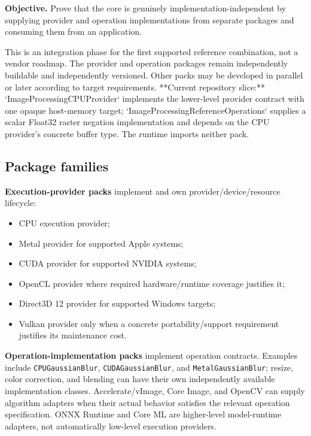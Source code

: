 
\textbf{Objective.} Prove that the core is genuinely implementation-independent by supplying provider and operation implementations from separate packages and consuming them from an application.

This is an integration phase for the first supported reference combination, not a vendor roadmap. The provider and operation packages remain independently buildable and independently versioned. Other packs may be developed in parallel or later according to target requirements. **Current repository slice:** `ImageProcessingCPUProvider` implements the lower-level provider contract with one opaque host-memory target; `ImageProcessingReferenceOperations` supplies a scalar Float32 raster negation implementation and depends on the CPU provider's concrete buffer type. The runtime imports neither pack.

\subsection{Package families}

\textbf{Execution-provider packs} implement \GEP{} and own provider/device/resource lifecycle:
\begin{itemize}
  \item CPU execution provider;
  \item Metal provider for supported Apple systems;
  \item CUDA provider for supported NVIDIA systems;
  \item OpenCL provider where required hardware/runtime coverage justifies it;
  \item Direct3D 12 provider for supported Windows targets;
  \item Vulkan provider only when a concrete portability/support requirement justifies its maintenance cost.
\end{itemize}

\textbf{Operation-implementation packs} implement \IPP{} operation contracts. Examples include \texttt{CPUGaussianBlur}, \texttt{CUDAGaussianBlur}, and \texttt{MetalGaussianBlur}; resize, color correction, and blending can have their own independently available implementation classes. Accelerate/vImage, Core Image, and OpenCV can supply algorithm adapters when their actual behavior satisfies the relevant operation specification. ONNX Runtime and Core ML are higher-level model-runtime adapters, not automatically low-level execution providers.

